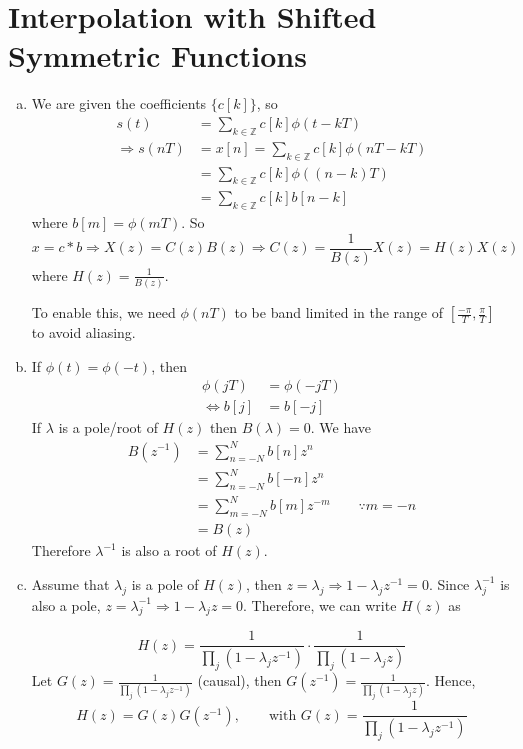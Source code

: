 \section{Interpolation with Shifted Symmetric Functions}\label{sec:p5}

\begin{enumerate}[(a)]
\item We are given the coefficients $\{c[k]\}$, so
\begin{align*}
	s(t) &= \sum_{k \in \mathbb{Z}} c[k] \phi (t-kT)\\
	\Rightarrow s(nT) &= x[n] = \sum_{k \in \mathbb{Z}}c[k] \phi(nT-kT) \\
	&= \sum_{k \in \mathbb{Z}} c[k] \phi((n-k)T) \\
	&= \sum_{k \in \mathbb{Z}} c[k] b[n-k]
\end{align*}
where $b[m] = \phi(mT)$. So
\[x = c * b \Rightarrow X(z) = C(z)B(z) \Rightarrow C(z) = \frac{1}{B(z)}X(z) = H(z)X(z)\]
where $H(z) = \frac{1}{B(z)}$.

To enable this, we need $\phi(nT)$ to be band limited in the range of $[\frac{-\pi}{T}, \frac{\pi}{T}]$ to avoid aliasing.

\item If $\phi(t) = \phi(-t)$, then
\begin{align*}
	\phi(jT) &= \phi(-jT) \\
	\Leftrightarrow b[j] &= b[-j]
\end{align*}
If $\lambda$ is a pole/root of $H(z)$ then $B(\lambda) = 0$. We have
\begin{align*}
	B(z^{-1})
	&= \sum_{n=-N}^{N} b[n] z^n \\
	&= \sum_{n=-N}^{N} b[-n] z^n \\
	&= \sum_{m=-N}^{N} b[m] z^{-m} \qquad \because m = -n \\
	&= B(z)
\end{align*}
Therefore $\lambda^{-1}$ is also a root of $H(z)$.

\item Assume that $\lambda_j$ is a pole of $H(z)$, then $z = \lambda_j \Rightarrow 1-\lambda_j z^{-1} = 0$. Since $\lambda_j^{-1}$ is also a pole, $z = \lambda_j^{-1} \Rightarrow 1 - \lambda_j z = 0$. Therefore, we can write $H(z)$ as

\[H(z)= \frac{1}{\prod_j (1-\lambda_j z^{-1})} \cdot \frac{1}{\prod_j (1-\lambda_jz)}\]
Let $G(z) = \frac{1}{\prod_j (1-\lambda_j z^{-1})}$ (causal), then $G(z^{-1}) = \frac{1}{\prod_j (1-\lambda_j z)}$. Hence, \[H(z) = G(z)G(z^{-1}), \qquad \text{with } G(z) = \frac{1}{\prod_j (1-\lambda_j z^{-1})}\]


\end{enumerate}
